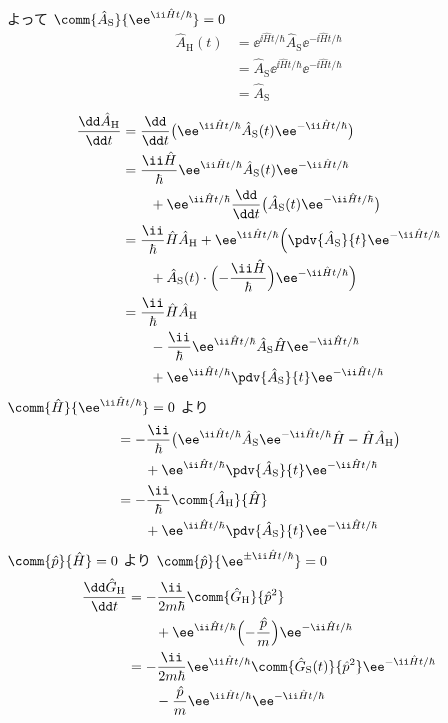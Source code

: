 よって $\comm{\hat{A}_{\mathrm{S}}}{\ee^{\ii\hat{H}t/\hbar}}=0$
\begin{align*}
\hat{A}_{\mathrm{H}}(t)&=\ee^{\ii\hat{H}t/\hbar}\hat{A}_{\mathrm{S}}\ee^{-\ii\hat{H}t/\hbar}\\
&=\hat{A}_{\mathrm{S}}\ee^{\ii\hat{H}t/\hbar}\ee^{-\ii\hat{H}t/\hbar}\\
&=\hat{A}_{\mathrm{S}}
\end{align*}
\begin{align*}
\frac{\dd\hat{A}_{\mathrm{H}}}{\dd t}&=\frac{\dd}{\dd t}\bigl(\ee^{\ii\hat{H}t/\hbar}\hat{A}_{\mathrm{S}}(t)\ee^{-\ii\hat{H}t/\hbar}\bigr)\\
&=\frac{\ii\hat{H}}{\hbar}\ee^{\ii\hat{H}t/\hbar}\hat{A}_{\mathrm{S}}(t)\ee^{-\ii\hat{H}t/\hbar}\\
&\qquad+\ee^{\ii\hat{H}t/\hbar}\frac{\dd}{\dd t}\bigl(\hat{A}_{\mathrm{S}}(t)\ee^{-\ii\hat{H}t/\hbar}\bigr)\\
&=\frac{\ii}{\hbar}\hat{H}\hat{A}_{\mathrm{H}}+\ee^{\ii\hat{H}t/\hbar}\Bigl(\pdv{\hat{A}_{\mathrm{S}}}{t}\ee^{-\ii\hat{H}t/\hbar}\\
&\qquad+\hat{A}_{\mathrm{S}}(t)\cdot\Bigl(-\frac{\ii\hat{H}}{\hbar}\Bigr)\ee^{-\ii\hat{H}t/\hbar}\Bigr)\\
&=\frac{\ii}{\hbar}\hat{H}\hat{A}_{\mathrm{H}}\\
&\qquad-\frac{\ii}{\hbar}\ee^{\ii\hat{H}t/\hbar}\hat{A}_{\mathrm{S}}\hat{H}\ee^{-\ii\hat{H}t/\hbar}\\
&\qquad+\ee^{\ii\hat{H}t/\hbar}\pdv{\hat{A}_{\mathrm{S}}}{t}\ee^{-\ii\hat{H}t/\hbar}
\end{align*}
$\comm{\hat{H}}{\ee^{\ii\hat{H}t/\hbar}}=0$ より
\begin{align*}
&=-\frac{\ii}{\hbar}\bigl(\ee^{\ii\hat{H}t/\hbar}\hat{A}_{\mathrm{S}}\ee^{-\ii\hat{H}t/\hbar}\hat{H}-\hat{H}\hat{A}_{\mathrm{H}}\bigr)\\
&\qquad+\ee^{\ii\hat{H}t/\hbar}\pdv{\hat{A}_{\mathrm{S}}}{t}\ee^{-\ii\hat{H}t/\hbar}\\
&=-\frac{\ii}{\hbar}\comm{\hat{A}_{\mathrm{H}}}{\hat{H}}\\
&\qquad+\ee^{\ii\hat{H}t/\hbar}\pdv{\hat{A}_{\mathrm{S}}}{t}\ee^{-\ii\hat{H}t/\hbar}
\end{align*}
$\comm{\hat{p}}{\hat{H}}=0$ より $\comm{\hat{p}}{\ee^{\pm\ii\hat{H}t/\hbar}}=0$
\begin{align*}
\frac{\dd\hat{G}_{\mathrm{H}}}{\dd t}&=-\frac{\ii}{2m\hbar}\comm{\hat{G}_{\mathrm{H}}}{\hat{p}^{2}}\\
&\qquad+\ee^{\ii\hat{H}t/\hbar}\Bigl(-\frac{\hat{p}}{m}\Bigr)\ee^{-\ii\hat{H}t/\hbar}\\
&=-\frac{\ii}{2m\hbar}\ee^{\ii\hat{H}t/\hbar}\comm{\hat{G}_{\mathrm{S}}(t)}{\hat{p}^{2}}\ee^{-\ii\hat{H}t/\hbar}\\
&\qquad-\frac{\hat{p}}{m}\ee^{\ii\hat{H}t/\hbar}\ee^{-\ii\hat{H}t/\hbar}
\end{align*}
